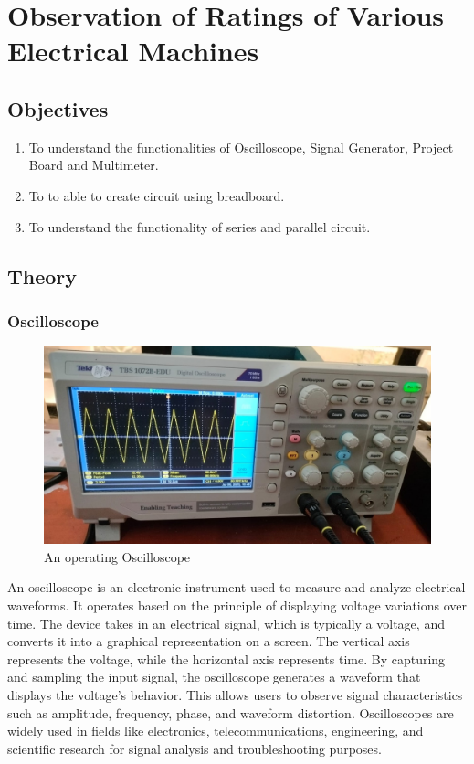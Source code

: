 

\chapter{Observation of Ratings of Various Electrical Machines}
\label{exp1}


\section{Objectives}
\begin{enumerate}
    \item To understand the functionalities of Oscilloscope, Signal Generator, Project
          Board and Multimeter.
    \item To to able to create circuit using breadboard.
    \item To understand the functionality of series and parallel circuit.
\end{enumerate}

\section{Theory}
\subsection{Oscilloscope}
\begin{figure}[H]
    \centering
    \includegraphics[scale=0.15]{src/exp01/oscilloscope.jpeg}
    \caption{An operating Oscilloscope}
\end{figure}
An oscilloscope is an electronic instrument used to measure and analyze electrical waveforms. It operates based on the principle of displaying voltage variations over time. The device takes in an electrical signal, which is typically a voltage, and converts it into a graphical representation on a screen. The vertical axis represents the voltage, while the horizontal axis represents time. By capturing and sampling the input signal, the oscilloscope generates a waveform that displays the voltage's behavior. This allows users to observe signal characteristics such as amplitude, frequency, phase, and waveform distortion. Oscilloscopes are widely used in fields like electronics, telecommunications, engineering, and scientific research for signal analysis and troubleshooting purposes.

